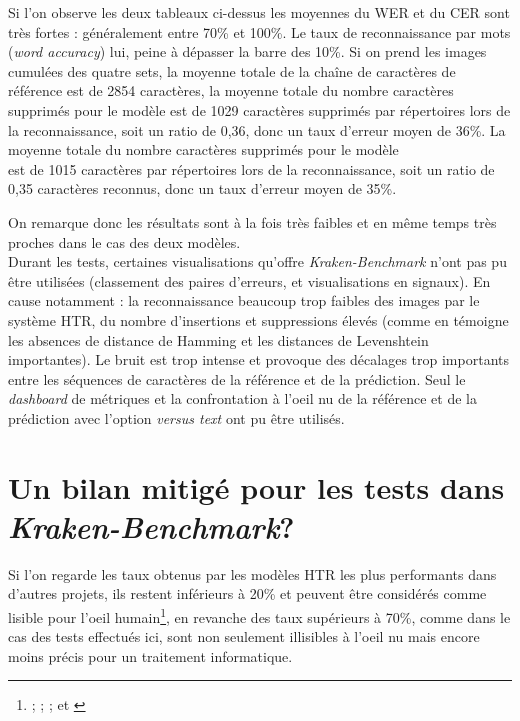 Si l'on observe les deux tableaux ci-dessus les moyennes du WER et du CER sont très fortes : généralement entre 70\% et 100\%. Le taux de reconnaissance par mots (\textit{word accuracy}) lui, peine à dépasser la barre des 10\%. Si on prend les images cumulées des quatre sets, la moyenne totale de la chaîne de caractères de référence est de 2854 caractères, la moyenne totale du nombre caractères supprimés pour le modèle  est de 1029 caractères supprimés par répertoires lors de la reconnaissance, soit un ratio de 0,36, donc un taux d'erreur moyen de 36\%. \newpage La moyenne totale du nombre caractères supprimés pour le modèle\\  est de 1015 caractères par répertoires lors de la reconnaissance, soit un ratio de 0,35 caractères reconnus, donc un taux d'erreur moyen de 35\%. 

On remarque donc les résultats sont à la fois très faibles et en même temps très proches dans le cas des deux modèles.\\

Durant les tests, certaines visualisations qu'offre \textit{Kraken-Benchmark} n'ont pas pu être utilisées (classement des paires d'erreurs, et visualisations en signaux). En cause notamment : la reconnaissance beaucoup trop faibles des images par le système HTR, du nombre d'insertions et suppressions élevés (comme en témoigne les absences de distance de Hamming et les distances de Levenshtein importantes). Le bruit est trop intense et provoque des décalages trop importants entre les séquences de caractères de la référence et de la prédiction. Seul le \textit{dashboard} de métriques et la confrontation à l'oeil nu de la référence et de la prédiction avec l'option \textit{versus text} ont pu être utilisés.

\section{Un bilan mitigé pour les tests dans\\ \textit{Kraken-Benchmark}?}

Si l'on regarde les taux obtenus par les modèles HTR les plus performants dans d'autres projets, ils restent inférieurs à 20\% et peuvent être considérés comme lisible pour l'oeil humain\footnote{\cite{barrere_results_2018};  \cite{pratikakis_icfhr_2018}; \cite{olver_machine_2017}; \cite{noauthor_comparing_2018} et \cite{lavrenko_holistic_2004}}, en revanche des taux supérieurs à 70\%, comme dans le cas des tests effectués ici, sont non seulement illisibles à l'oeil nu mais encore moins précis pour un traitement informatique. 

